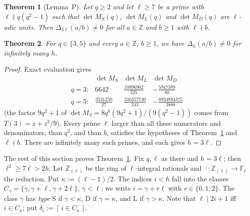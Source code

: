 \documentclass[11pt]{amsart}
\newtheorem{theorem}{Theorem}[section]
\theoremstyle{definition}
\theoremstyle{remark}
\numberwithin{equation}{section}
\newcommand{\ZZ}{\mathbb{Z}}
\newcommand{\FF}{\mathbb{F}}
\newcommand{\ind}[1]{[\,#1\,]}
\begin{document}
\begin{theorem}[Lemma~P]\label{thm:lemmaP}
Let $q\ge2$ and let $\ell\ge7$ be a prime with $\ell\nmid q(q^2-1)$ such that $\det M_S(q)$, $\det M_L(q)$ and
$\det M_D(q)$ are $\ell$-adic units. Then $\Delta_{3\ell}(a/b)\ne0$ for all $a\in\ZZ$ and $b\ge1$ with $\ell\nmid b$.
\end{theorem}

\begin{theorem}\label{thm:nonvan}
For $q\in\{3,5\}$ and every $a\in\ZZ$, $b\ge1$, we have $\Delta_h(a/b)\ne0$ for infinitely many $h$.
\end{theorem}

\begin{proof}
Exact evaluation gives
\[
\begin{array}{lccc}
 & \det M_S & \det M_L & \det M_D\\[2pt]
q=3: & 6642 & \frac{10896962}{225} & -\frac{5947389}{80}\\[4pt]
q=5: & \frac{3531250}{27} & \frac{246357730}{243} & -\frac{6934894375}{3888}
\end{array}
\]
(the factor $9q^2+1$ of $\det M_S=8q^6(9q^2+1)/(9(q^2-1))$ comes from $T(3)=z+z^3/9$). Every prime $\ell$ larger than
all these numerators and denominators, than $q^2$, and than $b$, satisfies the hypotheses of Theorem~\ref{thm:lemmaP}
and $\ell\nmid b$. There are infinitely many such primes, and each gives $h=3\ell$.
\end{proof}

The rest of this section proves Theorem~\ref{thm:lemmaP}. Fix $q,\ell$ as there and $h=3\ell$; then $\ell^2\ge7\ell>2h$.
Let $\ZZ_{(\ell)}$ be the ring of $\ell$-integral rationals and $\bar{\cdot}\colon\ZZ_{(\ell)}\to\FF_\ell$ the reduction. Put
$\kappa:=(\ell-1)/2$. The indices $i<h$ fall into the classes $C_\gamma=\{\gamma,\gamma+\ell,\gamma+2\ell\}$, $\gamma<\ell$;
we write $i=\gamma+r\ell$ with $r\in\{0,1,2\}$. The class $\gamma$ has \emph{type} S if $\gamma<\kappa$, D if $\gamma=\kappa$, and L if
$\gamma>\kappa$. Note that $\ell\mid2i+1$ iff $i\in C_\kappa$; put $\delta_i:=\ind{i\in C_\kappa}$.
\end{document}
